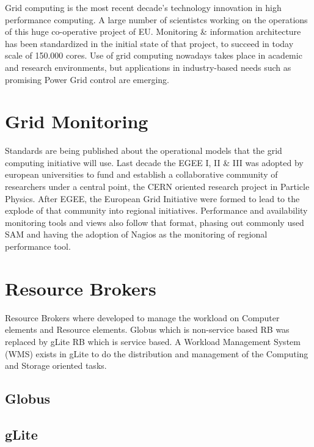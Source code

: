 
Grid computing \cite{li2005grid} is the most recent decade's technology
innovation in high performance computing. A large number of scientistcs working
on the operations of this huge co-operative project of EU. Monitoring \&
information architecture \cite{fisher2002datagrid} has been standardized in the
initial state of that project, to succeed in today scale of 150.000 cores. Use
of grid computing nowadays takes place in academic and research environments,
but applications in industry-based needs such as promising Power Grid control
\cite{Taylor2006} are emerging.

\section{Grid Monitoring}
Standards are being published about the operational models that the grid
computing initiative will use. Last decade the EGEE I, II \& III was adopted by
european universities to fund and establish a collaborative community of
researchers under a central point, the CERN oriented research project in
Particle Physics. After EGEE, the European Grid Initiative were formed to lead
to the explode of that community into regional initiatives. Performance
and availability monitoring tools and views also follow that format, phasing out
commonly used SAM \cite{egee3dsa122} and having the adoption of Nagios as the
monitoring of regional performance tool.

\section{Resource Brokers}
Resource Brokers \cite{Kertesz06ataxonomy} where developed to manage the
workload on Computer elements and Resource elements. Globus which is 
non-service based RB was replaced by gLite RB which is service based. A Workload
Management System (WMS) exists in gLite to do the distribution and management of
the Computing and Storage oriented tasks.


\subsection{Globus}
\subsection{gLite}

